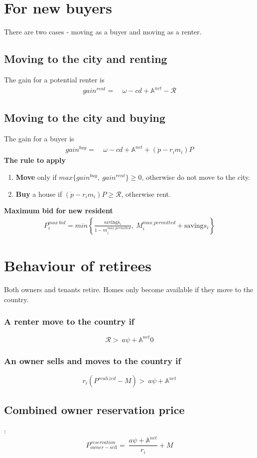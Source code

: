 \section{For new buyers}

There are two cases - moving as a buyer and moving as a renter.

\subsection{Moving to the city and renting}
The gain for a potential renter is 
\begin{align}
gain^{rent}
=&\ \omega-cd+\mathbb{A}^{net}-\mathcal{R}
  \nonumber
\end{align}

\subsection{Moving to the city and  buying}
The gain for a buyer is 
\begin{align}
gain^{buy}=&\ \omega-cd+\mathbb{A}^{net}+(\dot p-r_im_i)P   \nonumber
\end{align}
\textbf{The rule to apply}
\begin{enumerate}
    \item \textbf{Move} only if $max\{gain^{buy},\ gain^{rent}\} \ge 0$, otherwise do not move to the city.
    
    \item \textbf{Buy} a house if $(\dot p-r_im_i)P\ge  \mathcal{R}$, otherwise rent.
\end{enumerate}
\textbf{Maximum bid for new  resident}
\begin{align}
P_i^{max\ bid}= min \left\{\frac{\mathrm{savings}_i}{1-m_i^{max\_permitted}},\  M_i^{max\_permitted} + \mathrm{saving}s_i  \right\}   \nonumber  
\end{align}


\section{Behaviour of  retirees}
Both owners and tenants retire. Homes only become available if they move to the country. 
\subsubsection{A renter move to the country if} 
\[\mathcal{R} > \ a\psi+ \mathbb{A}^{net}0\]
\subsubsection{An owner sells and moves to the country if}
\[r_i(P^{realized}-M) >\ a\psi+ \mathbb{A}^{net}\] \subsection{ Combined owner reservation price}: 
\[P_{owner-sell}^{reservation} =\ \frac{a\psi+ \mathbb{A}^{net}}{r_i}+M \]

